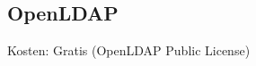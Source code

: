 \documentclass[main.tex]{subfiles}
\begin{document}
\subsection{OpenLDAP}
Kosten: Gratis (OpenLDAP Public License)
\end{document}
